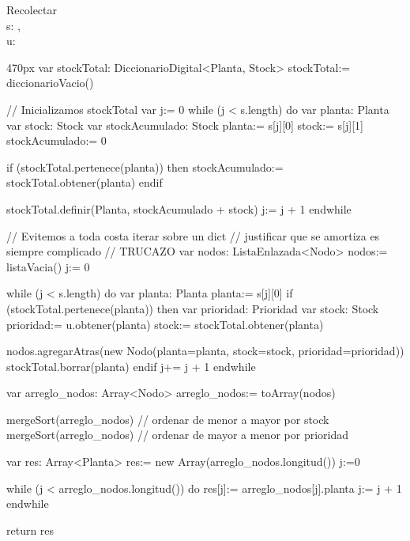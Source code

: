 \documentclass[10pt,a4paper]{article}
\begin{document}


\begin{proc}{Recolectar}{
  \\\Indent\In s: ,
  \\\Indent\In u: 
\\}{}
  \begin{ImplementationCode}{470px}
      var stockTotal: DiccionarioDigital<Planta, Stock>
          stockTotal:= diccionarioVacio()
    
      // Inicializamos stockTotal
      var j:= 0
      while (j < s.length) do
        var planta: Planta
        var stock: Stock
        var stockAcumulado: Stock
            planta:= s[j][0]
            stock:= s[j][1]
            stockAcumulado:= 0
    
        if (stockTotal.pertenece(planta)) then
            stockAcumulado:= stockTotal.obtener(planta)
        endif
    
        stockTotal.definir(Planta, stockAcumulado + stock)
        j:= j + 1
      endwhile
    
      // Evitemos a toda costa iterar sobre un dict
      // justificar que se amortiza es siempre complicado
      // TRUCAZO
      var nodos: ListaEnlazada<Nodo>
          nodos:= listaVacia()
          j:= 0
    
      while (j < s.length) do
        var planta: Planta
            planta:= s[j][0]
        if (stockTotal.pertenece(planta)) then
          var prioridad: Prioridad
          var stock: Stock
              prioridad:= u.obtener(planta)
              stock:= stockTotal.obtener(planta)
    
          nodos.agregarAtras(new Nodo(planta=planta, stock=stock, prioridad=prioridad))
          stockTotal.borrar(planta)
        endif
        j+= j + 1
      endwhile
    
      var arreglo_nodos: Array<Nodo>
          arreglo_nodos:= toArray(nodos)
      
      mergeSort(arreglo_nodos) // ordenar de menor a mayor por stock
      mergeSort(arreglo_nodos) // ordenar de mayor a menor por prioridad
    
    
      var res: Array<Planta>
          res:= new Array(arreglo_nodos.longitud())
          j:=0
    
      while (j < arreglo_nodos.longitud()) do
        res[j]:= arreglo_nodos[j].planta
        j:= j + 1
      endwhile
    
      return res
  \end{ImplementationCode}
\end{proc}
\end{document}
